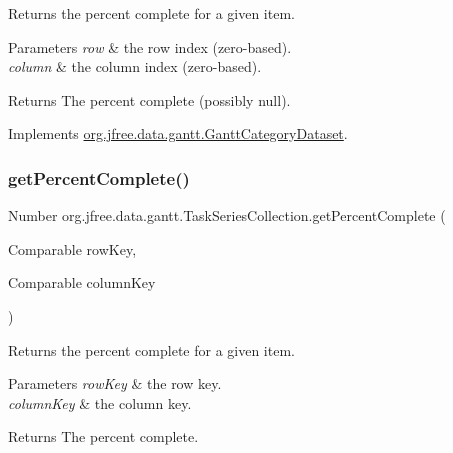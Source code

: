 Returns the percent complete for a given item.


\begin{DoxyParams}{Parameters}
{\em row} & the row index (zero-\/based). \\
\hline
{\em column} & the column index (zero-\/based).\\
\hline
\end{DoxyParams}
\begin{DoxyReturn}{Returns}
The percent complete (possibly {\ttfamily null}). 
\end{DoxyReturn}


Implements \mbox{\hyperlink{interfaceorg_1_1jfree_1_1data_1_1gantt_1_1_gantt_category_dataset_a92688e6bd8e5eb38b2c78888c21c8a2f}{org.\+jfree.\+data.\+gantt.\+Gantt\+Category\+Dataset}}.

\mbox{\label{classorg_1_1jfree_1_1data_1_1gantt_1_1_task_series_collection_a9c2470a0f1165d3c1554101e65ecc825}} 
\subsubsection{\texorpdfstring{get\+Percent\+Complete()}{getPercentComplete()}\hspace{0.1cm}{\footnotesize\ttfamily [2/4]}}
{\footnotesize\ttfamily Number org.\+jfree.\+data.\+gantt.\+Task\+Series\+Collection.\+get\+Percent\+Complete (\begin{DoxyParamCaption}\item[{Comparable}]{row\+Key,  }\item[{Comparable}]{column\+Key }\end{DoxyParamCaption})}

Returns the percent complete for a given item.


\begin{DoxyParams}{Parameters}
{\em row\+Key} & the row key. \\
\hline
{\em column\+Key} & the column key.\\
\hline
\end{DoxyParams}
\begin{DoxyReturn}{Returns}
The percent complete. 
\end{DoxyReturn}



